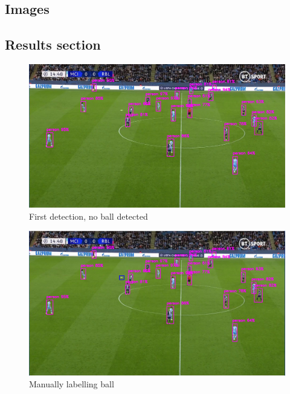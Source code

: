 \documentclass[
    11pt,
    oneside
]{report}
\begin{document}
\printbibliography



\appendix
\renewcommand{\thesection}{\Alph{section}.\arabic{section}}
\setcounter{section}{0}
\begin{appendices}


\section{Images}


\subsection{Results section}

\begin{figure}[H]
    \includegraphics[keepaspectratio, width=\columnwidth]{first.png}
    \caption{First detection, no ball detected}
    \label{img:1}
\end{figure}
\begin{figure}[H]
    \includegraphics[keepaspectratio, width=\columnwidth]{Screenshot_2022-03-03_21-32-51.png}
    \caption{Manually labelling ball}

\end{figure}
\end{appendices}
\end{document}
